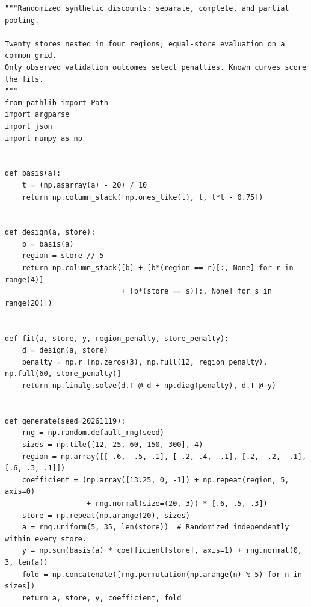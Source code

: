 \begin{Verbatim}[breaklines,breakanywhere,fontsize=\small]
"""Randomized synthetic discounts: separate, complete, and partial pooling.

Twenty stores nested in four regions; equal-store evaluation on a common grid.
Only observed validation outcomes select penalties. Known curves score the fits.
"""
from pathlib import Path
import argparse
import json
import numpy as np


def basis(a):
    t = (np.asarray(a) - 20) / 10
    return np.column_stack([np.ones_like(t), t, t*t - 0.75])


def design(a, store):
    b = basis(a)
    region = store // 5
    return np.column_stack([b] + [b*(region == r)[:, None] for r in range(4)]
                           + [b*(store == s)[:, None] for s in range(20)])


def fit(a, store, y, region_penalty, store_penalty):
    d = design(a, store)
    penalty = np.r_[np.zeros(3), np.full(12, region_penalty), np.full(60, store_penalty)]
    return np.linalg.solve(d.T @ d + np.diag(penalty), d.T @ y)


def generate(seed=20261119):
    rng = np.random.default_rng(seed)
    sizes = np.tile([12, 25, 60, 150, 300], 4)
    region = np.array([[-.6, -.5, .1], [-.2, .4, -.1], [.2, -.2, -.1], [.6, .3, .1]])
    coefficient = (np.array([13.25, 0, -1]) + np.repeat(region, 5, axis=0)
                   + rng.normal(size=(20, 3)) * [.6, .5, .3])
    store = np.repeat(np.arange(20), sizes)
    a = rng.uniform(5, 35, len(store))  # Randomized independently within every store.
    y = np.sum(basis(a) * coefficient[store], axis=1) + rng.normal(0, 3, len(a))
    fold = np.concatenate([rng.permutation(np.arange(n) % 5) for n in sizes])
    return a, store, y, coefficient, fold



\end{Verbatim}
